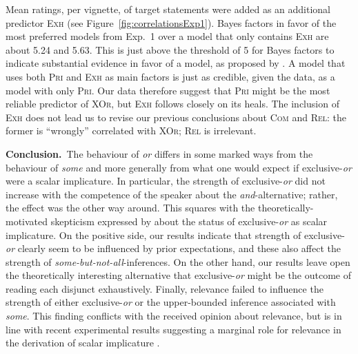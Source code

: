 \documentclass[12pt]{article}
\newcommand{\acro}[1]{\textsc{#1}\xspace}
\newcommand{\rel}{\acro{Rel}}
\newcommand{\com}{\acro{Com}}
\newcommand{\pri}{\acro{Pri}}
\newcommand{\exh}{\acro{Exh}}
\newcommand{\xor}{\acro{XOr}}
\begin{document}
Mean ratings, per vignette, of target statements were added as an additional predictor \exh
(see Figure~\ref{fig:correlationsExp1}). Bayes factors in favor of the most preferred models
from Exp.~1 over a model that only contains \exh are about 5.24 and 5.63. This is just above
the threshold of 5 for Bayes factors to indicate substantial evidence in favor of a model, as
proposed by \citet{Jeffreys1961:Theory-of-Proba}. A model that uses both \pri and \exh as main
factors is just as credible, given the data, as a model with only \pri. Our data therefore
suggest that \pri might be the most reliable predictor of \xor, but \exh follows closely on its
heals. The inclusion of \exh does not lead us to revise our previous conclusions about \com and
\rel: the former is ``wrongly'' correlated with \xor; \rel is irrelevant.

\medskip

\noindent \textbf{Conclusion.}\ The behaviour of \emph{or} differs in some marked ways from the
behaviour of \emph{some} and more generally from what one would expect if exclusive-\emph{or}
were a scalar implicature. In particular, the strength of exclusive-\emph{or} did not increase
with the competence of the speaker about the \emph{and}-alternative; rather, the effect was the
other way around. This squares with the theoretically-motivated skepticism expressed by
\citet{Geurts2006:Exclusive-disju} about the status of exclusive-\emph{or} as scalar
implicature. On the positive side, our results indicate that strength of exclusive-\emph{or}
clearly seem to be influenced by prior expectations, and these also affect the strength of
\emph{some-but-not-all}-inferences. On the other hand, our results leave open the theoretically
interesting alternative that exclusive-\emph{or} might be the outcome of reading each disjunct
exhaustively. Finally, relevance failed to influence the strength of either exclusive-\emph{or}
or the upper-bounded inference associated with \emph{some}. This finding conflicts with the
received opinion about relevance, but is in line with recent experimental results suggesting a
marginal role for relevance in the derivation of scalar implicature
\citep[e.g.][]{Zondervan2010:Scalar-Implicat}.






\end{document}
